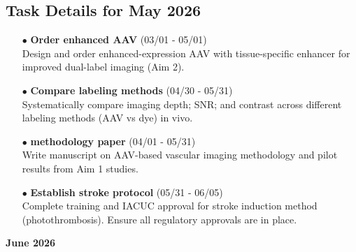 \documentclass[landscape,a4paper]{article}
\begin{document}
\vspace{0.5cm}
\subsection{Task Details for May 2026}
\begin{itemize}[leftmargin=1cm]
    \item[\textcolor{other}{$\bullet$}] \textbf{Order enhanced AAV} (03/01 - 05/01)\\ Design and order enhanced-expression AAV with tissue-specific enhancer for improved dual-label imaging (Aim 2).
    \item[\textcolor{other}{$\bullet$}] \textbf{Compare labeling methods} (04/30 - 05/31)\\ Systematically compare imaging depth; SNR; and contrast across different labeling methods (AAV vs dye) in vivo.
    \item[\textcolor{researchout}{$\bullet$}] \textbf{methodology paper} (04/01 - 05/31)\\ Write manuscript on AAV-based vascular imaging methodology and pilot results from Aim 1 studies.
    \item[\textcolor{other}{$\bullet$}] \textbf{Establish stroke protocol} (05/31 - 06/05)\\ Complete training and IACUC approval for stroke induction method (photothrombosis). Ensure all regulatory approvals are in place.
\end{itemize}

\newpage
\pagestyle{empty}

\begin{center}
{\large\textbf{June 2026}}
\end{center}

\vspace{0.5cm}
\end{document}
